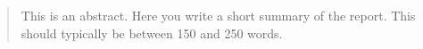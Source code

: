 \begin{abstract}\noindent
    This is an abstract. Here you write a short summary of the report. This should typically be between 150 and 250 words.
\end{abstract}

